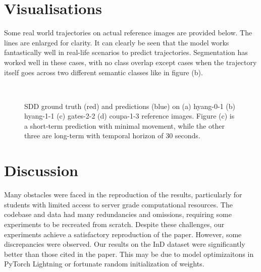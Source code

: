 \section{Visualisations}
Some real world trajectories on actual reference images are provided below. The lines are enlarged for clarity. It can clearly be seen that the model works fantastically well in real-life scenarios to predict trajectories. Segmentation has worked well in these cases, with no class overlap except cases when the trajectory itself goes across two different semantic classes like in figure (b).
\begin{figure}[H]
    \centering
     \\
    \caption{SDD ground truth (red) and predictions (blue) on (a) hyang-0-1 (b) hyang-1-1 (c) gates-2-2 (d) coupa-1-3 reference images. Figure (c) is a short-term prediction with minimal movement, while the other three are long-term with temporal horizon of 30 seconds.}
    \label{fig:foobar}
\end{figure}

\section{Discussion}

Many obstacles were faced in the reproduction of the results, particularly for students with limited access to server grade computational resources. The codebase and data had many redundancies and omissions, requiring some experiments to be recreated from scratch. Despite these challenges, our experiments achieve a satisfactory reproduction of the paper. However, some discrepancies were observed. Our results on the InD dataset were significantly better than those cited in the paper. This may be due to model optimizaitons in PyTorch Lightning or fortunate random initialization of weights. 

